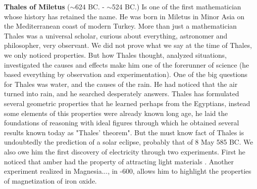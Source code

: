 \textbf{Thales of Miletus } ($\sim$624 BC. - $\sim$524 BC.) Is one of the first mathematician whose history has retained the name. He was born in Miletus in Minor Asia on the Mediterranean coast of modern Turkey. More than just a mathematician Thales was a universal scholar, curious about everything, astronomer and philosopher, very observant. We did not prove what we say at the time of Thales, we only noticed properties. But how Thales thought, analyzed situations, investigated the causes and effects make him one of the forerunner of science (he based everything by observation and experimentation). One of the big questions for Thales was water, and the causes of the rain. He had noticed that the air turned into rain, and he searched desperately answers. Thales has formulated several geometric properties that he learned perhaps from the Egyptians, instead some elements of this properties were already known long age, he laid the foundations of reasoning with ideal figures through which he obtained several results known today as "Thales' theorem". But the must know fact of Thales is undoubtedly the prediction of a solar eclipse, probably that of 8 May 585 BC. We also owe him the first discovery of electricity through two experiments. First he noticed that amber had the property of attracting light materials . Another experiment realized in Magnesia..., in -600, allows him to highlight the properties of magnetization of iron oxide.

